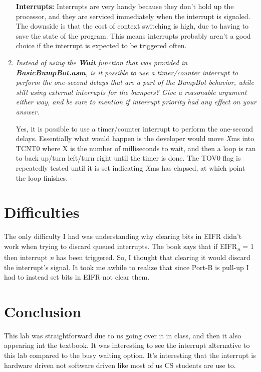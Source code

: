 \documentclass[12pt,letterpaper]{article}
\begin{document}
\begin{enumerate}
	
	\textbf{Interrupts:} Interrupts are very handy because they don't hold up the processor, and they are serviced immediately when the interrupt is signaled.
	The downside is that the cost of context switching is high, due to having to save the state of the program.
	This means interrupts probably aren't a good choice if the interrupt is expected to be triggered often.
	
	
	\item 
	\textit{Instead of using the \textbf{Wait} function that was provided in \textbf{BasicBumpBot.asm}, is it possible to use a timer/counter interrupt to perform the one-second delays that are a part of the BumpBot behavior, while still using external interrupts for the bumpers? 
	Give a reasonable argument either way, and be sure to mention if interrupt priority had any effect on your answer.}

	Yes, it is possible to use a timer/counter interrupt to perform the one-second delays.
	Essentially what would happen is the developer would move \textit{X}ms into TCNT0 where X is the number of milliseconds to wait, and then a loop is ran to back up/turn left/turn right until the timer is done.
	The TOV0 flag is repeatedly tested until it is set indicating \textit{X}ms has elapsed, at which point the loop finishes.
	

\end{enumerate}

\section{Difficulties}
	The only difficulty I had was understanding why clearing bits in EIFR didn't work when trying to discard queued interrupts.
	The book says that if EIFR\textsubscript{\textit{n}} = 1 then interrupt \textit{n} has been triggered.
	So, I thought that clearing it would discard the interrupt's signal.
	It took me awhile to realize that since Port-B is pull-up I had to instead set bits in EIFR not clear them.

\section{Conclusion}
		This lab was straightforward due to us going over it in class, and then it also appearing int the textbook.
		It was interesting to see the interrupt alternative to this lab compared to the busy waiting option.
		It's interesting that the interrupt is hardware driven not software driven like most of us CS students are use to.
\end{document}
